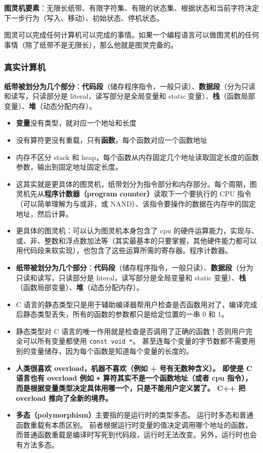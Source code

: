 
\begin{issues}
\issueDraft
\end{issues}


\textbf{图灵机要素}：无限长纸带、有限字符集、有限的状态集、根据状态和当前字符决定下一步行为（写入、移动）、初始状态、停机状态。

图灵可以完成任何计算机可以完成的事情。如果一个编程语言可以做图灵机的任何事情（除了纸带不是无限长），那么他就是图灵完备的。

\subsubsection{真实计算机}
\textbf{纸带被划分为几个部分}：\textbf{代码段}（储存程序指令，一般只读）、\textbf{数据段}（分为只读和读写，只读部分是 literal，读写部分是全局变量和 static 变量）、\textbf{栈}（函数局部变量）、\textbf{堆}（动态分配内存）。

\begin{itemize}
\item \textbf{变量}没有类型，就对应一个地址和长度
\item 没有算符更没有重载，只有\textbf{函数}，每个函数对应一个函数地址
\item 内存不区分 stack 和 heap，每个函数从内存固定几个地址读取固定长度的函数参数，输出到固定地址固定长度。
\item 这其实就是更具体的图灵机，纸带划分为指令部分和内存部分。每个周期，图灵机先从\textbf{程序计数器（program counter）}读取下一个要执行的 CPU 指令（可以简单理解为与或非，或 NAND）、该指令要操作的数据在内存中的固定地址，然后计算。
\item 更具体的图灵机：可以认为图灵机本身包含了 cpu 的硬件运算能力，实现与、或、非、整数和浮点数加法等（其实最基本的只要掌握，其他硬件能力都可以用代码段来软实现），也包含了这些运算所需的寄存器。程序计数器。
\item \textbf{纸带被划分为几个部分}：\textbf{代码段}（储存程序指令，一般只读）、\textbf{数据段}（分为只读和读写，只读部分是 literal，读写部分是全局变量和 static 变量）、\textbf{栈}（函数局部变量）、\textbf{堆}（动态分配内存）。
\item C 语言的静态类型只是用于辅助编译器帮用户检查是否函数用对了，编译完成后静态类型丢失，所有的函数的参数都只是给定位置的一串 0 和 1。
\item 静态类型对 C 语言的唯一作用就是检查是否调用了正确的函数！否则用户完全可以所有变量都使用 \verb`const void *`。 甚至连每个变量的字节数都不需要用别的变量储存，因为每个函数是知道每个变量的长度的。
\item \textbf{人类很喜欢 overload，机器不喜欢（例如 + 号有无数种含义）。 即使是 C 语言也有 overload 例如 \verb`+` 算符其实不是一个函数地址（或者 cpu 指令），而是根据变量类型决定具体用哪一个，只是不能用户定义罢了。 C++ 把 overload 推向了全新的境界。}
\item \textbf{多态（polymorphism）}主要指的是运行时的类型多态。 运行时多态和普通函数重载有本质区别。 前者根据运行时变量的值决定调用哪个地址的函数，而普通函数重载是编译时写死到代码段，运行时无法改变。另外，运行时也会有方法多态。
\end{itemize}
